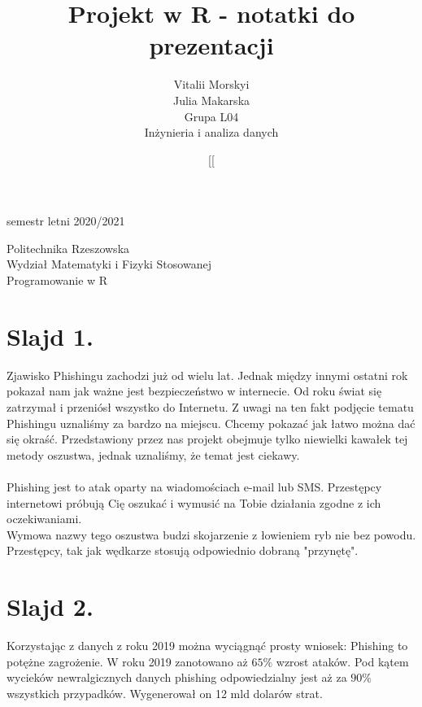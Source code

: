 \documentclass{article}
\date[semestr letni 2020/2021
\author{Vitalii Morskyi\\Julia Makarska\\Grupa L04\\Inżynieria i analiza danych}
\title{Projekt w R - notatki do prezentacji}
\makeatletter
\renewcommand{\maketitle}{\begin{titlepage}
		\vspace{0.5cm}
		\vspace{\stretch{6}}
		\begin{flushright}
			\date[semestr letni 2020/2021
		\end{flushright}	
		\vspace*{2cm}
		\begin{center}
			Politechnika Rzeszowska\\
			Wydział Matematyki i Fizyki Stosowanej\\
			Programowanie w R
		\end{center}
		\vspace{3cm}
		\noindent
		\begin{center}
			\Large \@title
		\end{center}
		\vspace{13cm}
		\begin{flushright}
			\begin{minipage}{6.5cm}
				\begin{flushright}
					\normalsize \@author \par
				\end{flushright}
			\end{minipage}
		\end{flushright}
	\end{titlepage}
}
\makeatother
\begin{document}
	\maketitle	
	\tableofcontents %
	\newpage
	
\section{Slajd 1.}
{
	Zjawisko Phishingu zachodzi już od wielu lat. Jednak między innymi ostatni rok pokazał nam jak ważne jest bezpieczeństwo w internecie. Od roku świat się zatrzymał i przeniósł wszystko do Internetu. Z uwagi na ten fakt podjęcie tematu Phishingu uznaliśmy za bardzo na miejscu. Chcemy pokazać jak łatwo można dać się okraść. Przedstawiony przez nas projekt obejmuje tylko niewielki kawałek tej metody oszustwa, jednak uznaliśmy, że temat jest ciekawy.\\
	~\\
	Phishing jest to atak oparty na wiadomościach e-mail lub SMS. Przestępcy internetowi próbują Cię oszukać i wymusić na Tobie działania zgodne z ich oczekiwaniami.\\
	Wymowa nazwy tego oszustwa budzi skojarzenie z łowieniem ryb nie bez powodu. Przestępcy, tak jak wędkarze stosują odpowiednio dobraną "przynętę".
}
\section{Slajd 2.}
{
	Korzystając z danych z roku 2019 można wyciągnąć prosty wniosek: Phishing to potężne zagrożenie. W roku 2019 zanotowano aż $65\%$ wzrost ataków. Pod kątem wycieków newralgicznych danych phishing odpowiedzialny jest aż za $90\%$ wszystkich przypadków. Wygenerował on 12 mld dolarów strat.
}
\end{document}

